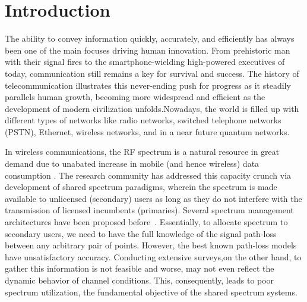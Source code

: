 \chapter{Introduction} %
\label{chap:intro} %
The ability to convey information quickly, accurately, and efficiently has always been one of the main focuses driving human innovation. From prehistoric man with their signal fires to the smartphone-wielding high-powered executives of today, communication still remains a key for survival and success. The history of telecommunication illustrates this never-ending push for progress as it steadily parallels human growth, becoming more widespread and efficient as the development of modern civilization unfolds.Nowadays, the world is filled up with different types of networks like radio networks, switched telephone networks (PSTN), Ethernet, wireless networks, and in a near future quantum networks.

In wireless communications, the RF spectrum is a natural resource in great demand due to unabated increase in mobile (and hence wireless) data consumption \cite{Jeffrey14}. 
The research community has addressed this capacity crunch via development of shared spectrum paradigms, wherein the spectrum is made available to unlicensed (secondary) users as long as they do not interfere with the transmission of licensed incumbents (primaries).
Several spectrum management architectures have been proposed before~\cite{spectrumAllocationSurvey13,parishad18,milind05,sudeep16}.
Essentially, to allocate spectrum to secondary users, we need to have the full knowledge of the signal path-loss between any arbitrary pair of points. However, the best known path-loss models~\cite{chamberlin82,hata2000} have unsatisfactory accuracy. Conducting extensive surveys,on the other hand, to gather this information is not feasible and worse, may not even reflect the dynamic behavior of channel conditions.
This, consequently, leads to poor spectrum utilization, the fundamental objective of the shared spectrum
systems.

